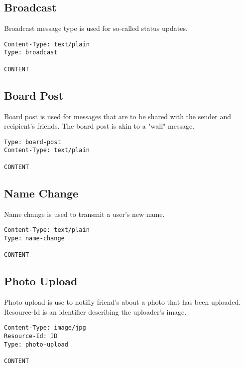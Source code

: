 \documentclass[letterpaper,11pt,oneside]{article}
\begin{document}
\subsection{Broadcast}

Broadcast message type is used for so-called status updates.

\vspace{10pt}
\begin{verbatim}
Content-Type: text/plain
Type: broadcast

CONTENT
\end{verbatim}
\vspace{10pt}

\subsection{Board Post}

Board post is used for messages that are to be shared with the sender and
recipient's friends. The board post is akin to a "wall" message.

\vspace{10pt}
\begin{verbatim}
Type: board-post
Content-Type: text/plain

CONTENT
\end{verbatim}
\vspace{10pt}

\subsection{Name Change}

Name change is used to transmit a user's new name.

\vspace{10pt}
\begin{verbatim}
Content-Type: text/plain
Type: name-change

CONTENT
\end{verbatim}
\vspace{10pt}

\subsection{Photo Upload}

Photo upload is use to notifiy friend's about a photo that has been uploaded.
Resource-Id is an identifier describing the uploader's image.

\vspace{10pt}
\begin{verbatim}
Content-Type: image/jpg
Resource-Id: ID
Type: photo-upload

CONTENT
\end{verbatim}
\vspace{10pt}
\end{document}
